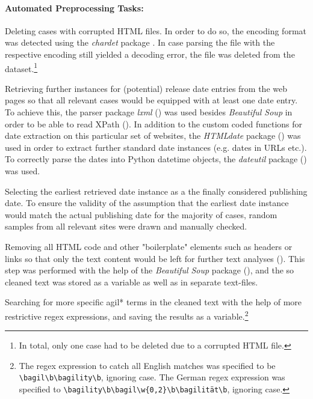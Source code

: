 \paragraph{Automated Preprocessing Tasks:} 
\begin{compactitem}
\item Deleting cases with corrupted HTML files. In order to do so, the encoding format was detected using the \textit{chardet} package \parencite{Pilgrim2015}. In case parsing the file with the respective encoding still yielded a decoding error, the file was deleted from the dataset.\footnote{In total, only one case had to be deleted due to a corrupted HTML file.}
\item Retrieving further instances for (potential) release date entries from the web pages so that all relevant cases would be equipped with at least one date entry. To achieve this, the parser package \textit{lxml} (\cite{Faassen2006}) was used besides \textit{Beautiful Soup} in order to be able to read XPath (\cite{Clark1999}). In addition to the custom coded functions for date extraction on this particular set of websites, the \textit{HTMLdate} package (\cite{Barbaresi2020}) was used in order to extract further standard date instances (e.g. dates in URLs etc.). To correctly parse the dates into Python datetime objects, the \textit{dateutil} package (\cite{Niemeyer2003}) was used.
\item Selecting the earliest retrieved date instance as a the finally considered publishing date. To ensure the validity of the assumption that the earliest date instance would match the actual publishing date for the majority of cases, random samples from all relevant sites were drawn and manually checked.
\item Removing all HTML code and other "boilerplate" elements such as headers or links so that only the text content would be left for further text analyses (\cite*[p. 19]{Ludeling2015}). This step was performed with the help of the \textit{Beautiful Soup} package (\cite{Richardson2007}), and the so cleaned text was stored as a variable as well as in separate text-files.
\item Searching for more specific agil* terms in the cleaned text with the help of more restrictive regex expressions, and saving the results as a variable.\footnote{The regex expression to catch all English matches was specified to be \texttt{\textbackslash bagil\textbackslash b\textbar \textbackslash bagility\textbackslash b}, ignoring case. The German regex expression was specified to \texttt{\textbackslash bagility\textbackslash b\textbar \textbackslash bagil\textbackslash w\{0,2\}\textbackslash b\textbar \textbackslash bagilität\textbackslash b}, ignoring case.} 

\end{compactitem}
